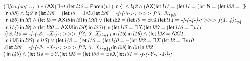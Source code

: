 \documentclass{article}
\newcommand{\AX}{\mbox{\sf{AX}}}
\newcommand{\mita}[1]{\mbox{\it{{#1}}}}
\newcommand{\msf}[1]{\mbox{\sf{{#1}}}}
\newcommand{\mth}[1]{\({#1}\)}
\newcommand{\ttlb}{\mbox{\tt \char'173}}
\newcommand{\ttrb}{\mbox{\tt \char'175}}
\begin{document}
\[\begin{array}{l}
(\exists \mita{foo} . \mita{foo(...) }) \wedge (\AX(\exists \mita{v1} . (\mita{\sf{let}} \, \mita{l42} = \msf{Paren}(v1) \, \mita{\sf{in}} \, \mita{{\ttlb}
  } \wedge \mita{l42} \wedge (\AX(\mita{\sf{let}} \, \mita{l11} = (\mita{\sf{let}} \, \mita{l1} = (\mita{\sf{let}} \, \mita{l8} = (\mita{\sf{let}} \, \mita{l38} = \mita{
{\ttrb}}\\\mbox{} \, \mita{\sf{in}} \, \mita{l38}
) \wedge \mita{l42} \, \mita{\sf{in}} \, (\mita{\sf{let}} \, \mita{l36} = (\mita{\sf{let}} \, \mita{l6} = \exists \mita{v5} . (\mita{\sf{let}} \, \mita{l26} = \mita{-f-(-3-)-;
  \mth{>}\mth{>}\mth{>} f(3, 3);}_{\mita{v5}}\\\mbox{} \, \mita{\sf{in}} \, \mita{l26}
) \, \mita{\sf{in}} \, \mita{l6}
) \wedge (\mita{\sf{let}} \, \mita{l5} = \AX\mita{l8} \, \mita{\sf{in}} \, \mita{l5}
) \, \mita{\sf{in}} \, \mita{l36}
) \vee (\mita{\sf{let}} \, \mita{l22} = (\mita{\sf{let}} \, \mita{l9} = \exists \mita{v4} . (\mita{\sf{let}} \, \mita{l14} = \mita{-f-(-4-)-;
  \mth{>}\mth{>}\mth{>} f(4, 4);}_{\mita{v4}}\\\mbox{} \, \mita{\sf{in}} \, \mita{l14}
) \, \mita{\sf{in}} \, \mita{l9}
) \wedge (\mita{\sf{let}} \, \mita{l20} = \AX\mita{l8} \, \mita{\sf{in}} \, \mita{l20}
) \, \mita{\sf{in}} \, \mita{l22}
)
) \, \mita{\sf{in}} \, (\mita{\sf{let}} \, \mita{l17} = \exists \mita{X} . (\mita{\sf{let}} \, \mita{l37} = (\mita{\sf{let}} \, \mita{l16} = \exists \mita{v11}\\\mbox{} . (\mita{\sf{let}} \, \mita{l15} = \mita{-f-(-3-, -X-)-;
  \mth{>}\mth{>}\mth{>} f(3, 3, X);}_{\mita{v11}} \, \mita{\sf{in}} \, \mita{l15}
) \, \mita{\sf{in}} \, \mita{l16}
) \wedge (\mita{\sf{let}} \, \mita{l28} = \AX\mita{l1}\\\mbox{} \, \mita{\sf{in}} \, \mita{l28}
) \, \mita{\sf{in}} \, \mita{l37}
) \, \mita{\sf{in}} \, \mita{l17}
) \vee (\mita{\sf{let}} \, \mita{l43} = (\mita{\sf{let}} \, \mita{l10} = (\mita{\sf{let}} \, \mita{l40} = \neg (\mita{\sf{let}} \, \mita{l32} = \exists \mita{X} . (\mita{\sf{let}} \, \mita{l2} = \exists \mita{v10}\\\mbox{} . (\mita{\sf{let}} \, \mita{l29} = \mita{-f-(-3-, -X-)-;
  \mth{>}\mth{>}\mth{>} f(3, 3, X);}_{\mita{v10}} \, \mita{\sf{in}} \, \mita{l29}
) \, \mita{\sf{in}} \, \mita{l2}
) \, \mita{\sf{in}} \, \mita{l32}\\\mbox{}
) \, \mita{\sf{in}} \, \mita{l40}
) \wedge (\mita{\sf{let}} \, \mita{l18} = \exists \mita{Y} . (\mita{\sf{let}} \, \mita{l25} = (\mita{\sf{let}} \, \mita{l33} = \exists \mita{v9} . (\mita{\sf{let}} \, \mita{l31} = \mita{-f-(-Y-, -4-)-;
}
\end{array}\]
\end{document}
